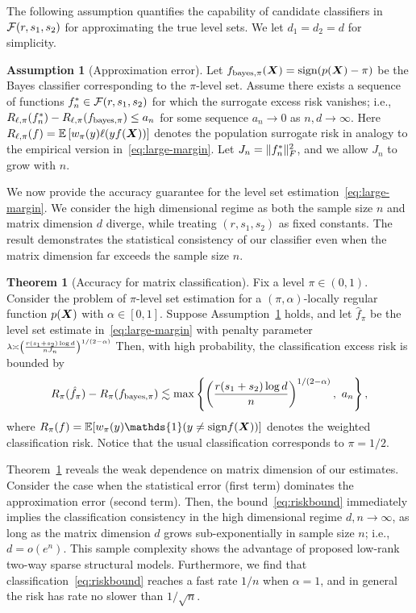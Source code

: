 \documentclass[11pt]{article}
\theoremstyle{definition}
\newtheorem{thm}{Theorem}[section]
\newtheorem{assumption}{Assumption}
\def\sign{\textup{sign}}
\def\bayespif{f_{\textup{bayes},\pi}}
\begin{document}
The following assumption quantifies the capability of candidate classifiers in $\mathcal{F}(r,s_1,s_2)$ for approximating the true level sets. We let $d_1=d_2=d$ for simplicity. 

\begin{assumption}[Approximation error]\label{ass:main} 
Let $f_{\text{bayes},\pi}(\mX)=\sign(p(\mX) -\pi)$ be the Bayes classifier corresponding to the $\pi$-level set. Assume there exists a sequence of functions $f_n^*\in\mathcal{F}(r,s_1,s_2)$ for which the surrogate excess risk vanishes; i.e., $R_{\ell,\pi}(f^*_n)-R_{\ell,\pi}(\bayespif)\leq a_n$ for some sequence $a_n\to 0$ as $n,d\to \infty$. Here $R_{\ell,\pi}(f)=\mathbb{E}\left[w_\pi(y)\ell(yf(\bm X))\right]$ denotes the population surrogate risk in analogy to the empirical version in~\eqref{eq:large-margin}. Let $J_n=\lVert f^*_n\rVert_F^2$, and we allow $J_n$ to grow with $n$. 
\end{assumption}

We now provide the accuracy guarantee for the level set estimation~\eqref{eq:large-margin}. We consider the high dimensional regime as both the sample size $n$ and matrix dimension $d$ diverge, while treating $(r,s_1,s_2)$ as fixed constants. The result demonstrates the statistical consistency of our classifier even when the matrix dimension far exceeds the sample size $n$. 

\begin{thm}[Accuracy for matrix classification]\label{thm:main} Fix a level $\pi\in(0,1)$. Consider the problem of $\pi$-level set estimation for a $(\pi,\alpha)$-locally regular function $p(\bm X)$ with $\alpha\in[0,1]$. Suppose Assumption~\ref{ass:main} holds, and let $\hat f_\pi$ be the level set estimate in~\eqref{eq:large-margin} with penalty parameter $\scriptstyle\lambda\asymp \left( r( s_1+s_2)\log d \over  nJ_n\right)^{1/(2-\alpha)}$ Then, with high probability, the classification excess risk is bounded by 
\begin{equation}\label{eq:riskbound}
 R_{\pi}( \hat f_\pi)-R_{\pi}(\bayespif) \lesssim \max\left\{\left({r(s_1+s_2)\log d \over n}\right)^{1/(2-\alpha)},\ a_n\right\},
\end{equation}
where $R_{\pi}(f)=\mathbb{E}[w_\pi(y)\mathds{1}(y\neq \sign f(\mX))]$ denotes the weighted classification risk. Notice that the usual classification corresponds to $\pi = 1/2$. 

\end{thm}

Theorem~\ref{thm:main} reveals the weak dependence on matrix dimension of our estimates. Consider the case when the statistical error (first term) dominates the approximation error (second term). Then, the bound~\eqref{eq:riskbound} immediately implies the classification consistency in the high dimensional regime $d,n\to \infty$, as long as the matrix dimension $d$ grows sub-exponentially in sample size $n$; i.e., $d=o(e^n)$. This sample complexity shows the advantage of proposed low-rank two-way sparse structural models. Furthermore, we find that classification~\eqref{eq:riskbound} reaches a fast rate $1/n$ when $\alpha=1$, and in general the risk has rate no slower than $1/\sqrt{n}$. 
\end{document}
